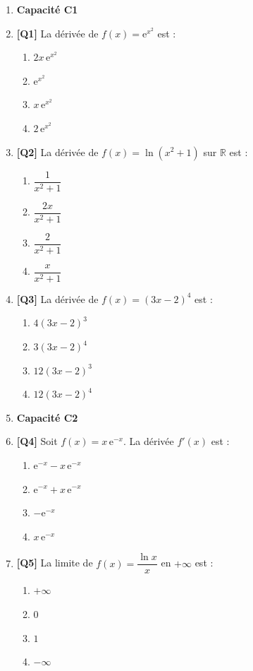 \begin{enumerate}

\item[] \textbf{Capacité C1}

\item \textbf{[Q1]} La dérivée de $f(x) = \mathrm{e}^{x^2}$ est :
  \begin{enumerate}[label=\Alph*.]
    \item $2x\,\mathrm{e}^{x^2}$
    \item $\mathrm{e}^{x^2}$
    \item $x\,\mathrm{e}^{x^2}$
    \item $2\,\mathrm{e}^{x^2}$
  \end{enumerate}

\item \textbf{[Q2]} La dérivée de $f(x) = \ln(x^2 + 1)$ sur $\mathbb{R}$ est :
  \begin{enumerate}[label=\Alph*.]
    \item $\dfrac{1}{x^2 + 1}$
    \item $\dfrac{2x}{x^2 + 1}$
    \item $\dfrac{2}{x^2 + 1}$
    \item $\dfrac{x}{x^2 + 1}$
  \end{enumerate}

\item \textbf{[Q3]} La dérivée de $f(x) = (3x - 2)^4$ est :
  \begin{enumerate}[label=\Alph*.]
    \item $4(3x-2)^3$
    \item $3(3x-2)^4$
    \item $12(3x-2)^3$
    \item $12(3x-2)^4$
  \end{enumerate}

\item[] \textbf{Capacité C2}

\item \textbf{[Q4]} Soit $f(x) = x\,\mathrm{e}^{-x}$. La dérivée $f'(x)$ est :
  \begin{enumerate}[label=\Alph*.]
    \item $\mathrm{e}^{-x} - x\,\mathrm{e}^{-x}$
    \item $\mathrm{e}^{-x} + x\,\mathrm{e}^{-x}$
    \item $-\mathrm{e}^{-x}$
    \item $x\,\mathrm{e}^{-x}$
  \end{enumerate}

\item \textbf{[Q5]} La limite de $f(x) = \dfrac{\ln x}{x}$ en $+\infty$ est :
  \begin{enumerate}[label=\Alph*.]
    \item $+\infty$
    \item $0$
    \item $1$
    \item $-\infty$
  \end{enumerate}


\end{enumerate}
